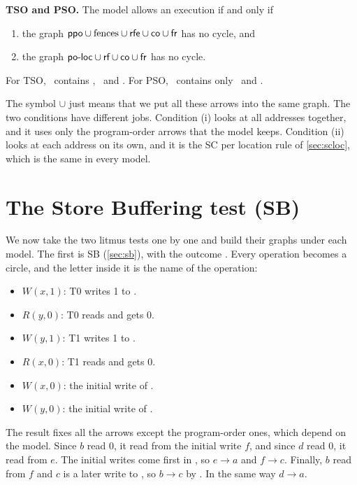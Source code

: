 \begin{notebox}
\textbf{TSO and PSO.} The model allows an execution if and only if
\begin{enumerate}[label=(\roman*)]
\item the graph $\textsf{ppo} \cup \text{fences} \cup \textsf{rfe} \cup \textsf{co} \cup \textsf{fr}$ has no cycle, and
\item the graph $\textsf{po-loc} \cup \textsf{rf} \cup \textsf{co} \cup \textsf{fr}$ has no cycle.
\end{enumerate}
For TSO, \ppo\ contains \RR, \RW\ and \WW. For PSO, \ppo\ contains only \RR\ and \RW.
\end{notebox}

The symbol $\cup$ just means that we put all these arrows into the same graph. The two conditions have different jobs. Condition (i) looks at all addresses together, and it uses only the program-order arrows that the model keeps. Condition (ii) looks at each address on its own, and it is the SC per location rule of \cref{sec:scloc}, which is the same in every model.

\section{The Store Buffering test (SB)}
\label{sec:sbgraph}

We now take the two litmus tests one by one and build their graphs under each model. The first is SB (\cref{sec:sb}), with the outcome . Every operation becomes a circle, and the letter inside it is the name of the operation:
\begin{itemize}
\item[\textbf{a}] $W(x,1)$: T0 writes 1 to .
\item[\textbf{b}] $R(y,0)$: T0 reads  and gets 0.
\item[\textbf{c}] $W(y,1)$: T1 writes 1 to .
\item[\textbf{d}] $R(x,0)$: T1 reads  and gets 0.
\item[\textbf{e}] $W(x,0)$: the initial write of .
\item[\textbf{f}] $W(y,0)$: the initial write of .
\end{itemize}
The result fixes all the arrows except the program-order ones, which depend on the model. Since $b$ read 0, it read from the initial write $f$, and since $d$ read 0, it read from $e$. The initial writes come first in \co, so $e \to a$ and $f \to c$. Finally, $b$ read from $f$ and $c$ is a later write to , so $b \to c$ by \fr. In the same way $d \to a$.

